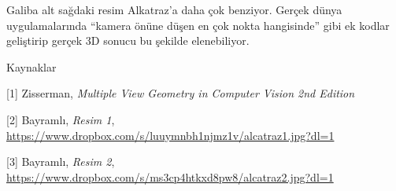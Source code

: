 \documentclass[12pt,fleqn]{article}\usepackage{../../common}
\begin{document}
Galiba alt sağdaki resim Alkatraz'a daha çok benziyor. Gerçek dünya
uygulamalarında ``kamera önüne düşen en çok nokta hangisinde'' gibi ek
kodlar geliştirip gerçek 3D sonucu bu şekilde elenebiliyor. 

Kaynaklar

[1] Zisserman, {\em Multiple View Geometry in Computer Vision 2nd Edition}

[2] Bayramlı, {\em Resim 1}, \url{https://www.dropbox.com/s/luuymnbh1njmz1v/alcatraz1.jpg?dl=1}

[3] Bayramlı, {\em Resim 2}, \url{https://www.dropbox.com/s/ms3cp4htkxd8pw8/alcatraz2.jpg?dl=1}
\end{document}
